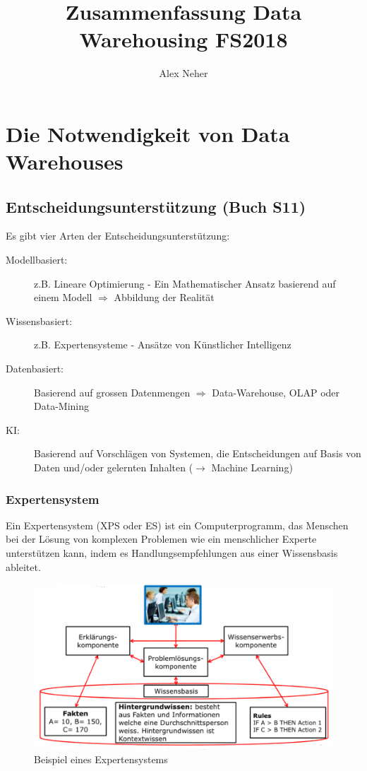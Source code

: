\documentclass[a4paper, 11pt]{article}
\begin{document}
\title{Zusammenfassung Data Warehousing FS2018}
\author{Alex Neher}
\maketitle

\tableofcontents
\newpage

\graphicspath{{./Pictures/}}

\section{Die Notwendigkeit von Data Warehouses}
\subsection{Entscheidungsunterstützung (Buch S11)}
Es gibt vier Arten der Entscheidungsunterstützung:

\begin{description}
	\item [Modellbasiert:] z.B. Lineare Optimierung - Ein Mathematischer Ansatz basierend auf einem Modell $\Longrightarrow$ Abbildung der Realität
	\item [Wissensbasiert: ] z.B. Expertensysteme - Ansätze von Künstlicher Intelligenz
	\item [Datenbasiert: ] Basierend auf grossen Datenmengen $\Longrightarrow$ Data-Warehouse, OLAP oder Data-Mining
	\item [KI: ] Basierend auf Vorschlägen von Systemen, die Entscheidungen auf Basis von Daten und/oder gelernten Inhalten ($\longrightarrow$ Machine Learning)
\end{description}

\subsubsection{Expertensystem}
Ein Expertensystem (XPS oder ES) ist ein Computerprogramm, das Menschen bei der Lösung von komplexen Problemen wie ein menschlicher Experte unterstützen kann, indem es Handlungsempfehlungen aus einer Wissensbasis ableitet.

\begin{figure}[htb]
	\centering
	\includegraphics[keepaspectratio=true,height=18\baselineskip]{expertensystem.png}
	\caption{Beispiel eines Expertensystems}
	\label{fig:xps}
\end{figure}
\end{document}
